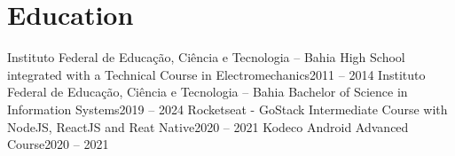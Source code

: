 \section{Education}
  \resumeSubHeadingListStart
    \resumeSubheading
      {Instituto Federal de Educação, Ciência e Tecnologia – Bahia}{}
      {High School integrated with a Technical Course in Electromechanics}{2011 -- 2014}
    \resumeSubheading
      {Instituto Federal de Educação, Ciência e Tecnologia – Bahia}{}
      {Bachelor of Science in Information Systems}{2019 -- 2024}
    \resumeSubheading
      {Rocketseat - GoStack}{}
      {Intermediate Course with NodeJS, ReactJS and Reat Native}{2020 -- 2021}
    \resumeSubheading
      {Kodeco}{}
      {Android Advanced Course}{2020 -- 2021}
  \resumeSubHeadingListEnd